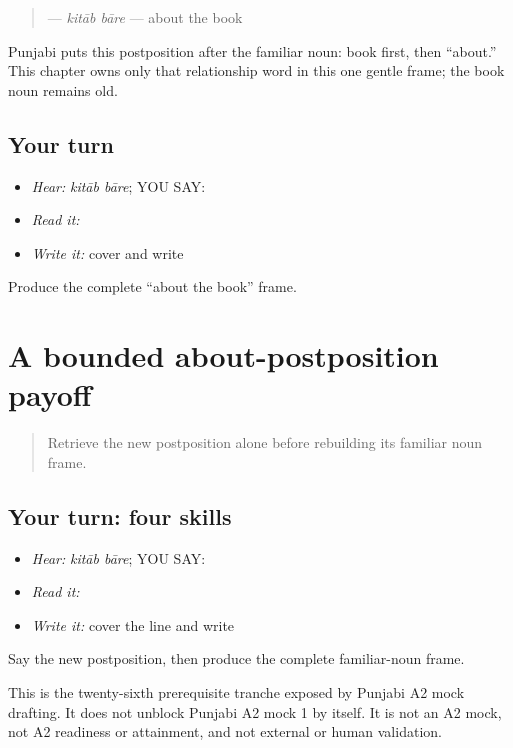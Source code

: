 \begin{grammarlens}[title={Grammar Lens}]
\begin{quote}
\textbf{ } — \emph{kitāb bāre} — about the book
\end{quote}

Punjabi puts this postposition after the familiar noun: book first, then “about.” This chapter owns only that relationship word in this one gentle frame; the book noun remains old.
\end{grammarlens}

\subsection*{Your turn}
\begin{itemize}
\raggedright
  \item \emph{Hear:} \emph{kitāb bāre}; YOU SAY: \textbf{ }
  \item \emph{Read it:} \textbf{ }
  \item \emph{Write it:} cover and write \textbf{ }
\end{itemize}

\begin{tcolorbox}[breakable,colback=teal!4,colframe=teal!35!black,title={Before you move on}]
Produce the complete “about the book” frame.
\end{tcolorbox}
\section[\texorpdfstring{\pa{ਕਿਤਾਬ} \pa{ਬਾਰੇ} (kitaab baare)}{ਕਿਤਾਬ ਬਾਰੇ (kitaab baare)}]{A bounded about-postposition payoff}

\label{lesson:PA-C203-payoff}



\begin{quote}
Retrieve the new postposition alone before rebuilding its familiar noun frame.
\end{quote}

\subsection*{Your turn: four skills}
\begin{itemize}
\raggedright
  \item \emph{Hear:} \emph{kitāb bāre}; YOU SAY: \textbf{ }
  \item \emph{Read it:} \textbf{ }
  \item \emph{Write it:} cover the line and write \textbf{ }
\end{itemize}

\begin{tcolorbox}[breakable,colback=teal!4,colframe=teal!35!black,title={Before you move on}]
Say the new postposition, then produce the complete familiar-noun frame.

This is the twenty-sixth prerequisite tranche exposed by Punjabi A2 mock drafting. It does not unblock Punjabi A2 mock 1 by itself. It is not an A2 mock, not A2 readiness or attainment, and not external or human validation.
\end{tcolorbox}

